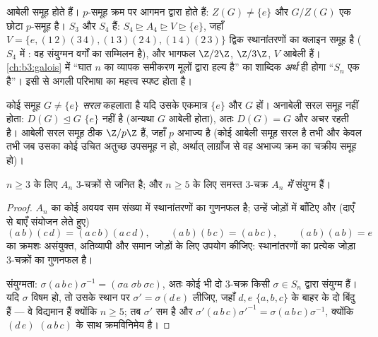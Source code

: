 \begin{example}\label{ex:b3:groups:solvableexamples}
आबेली समूह  होते हैं। $p$-समूह क्रम पर आगमन द्वारा 
होते हैं: $Z(G) \neq \{e\}$ और $G/Z(G)$ एक छोटा $p$-समूह है। $S_3$ और $S_4$
 हैं: $S_4 \trianglerighteq A_4
\trianglerighteq V \trianglerighteq \{e\}$, जहाँ $V = \{e,
(1\,2)(3\,4), (1\,3)(2\,4), (1\,4)(2\,3)\}$ द्विक स्थानांतरणों का क्लाइन समूह
है ($S_4$ में : वह संयुग्मन वर्गों का सम्मिलन है),
और भागफल $\Z/2\Z$, $\Z/3\Z$, $V$ आबेली हैं। \cref{ch:b3:galois} में ``घात $n$
का व्यापक समीकरण मूलों द्वारा हल्य है'' का शाब्दिक \emph{अर्थ}
ही होगा ``$S_n$ एक  है''। इसी से अगली परिभाषा का महत्त्व
स्पष्ट होता है।
\end{example}

\begin{definition}\label{def:b3:groups:simple}
कोई समूह $G \neq \{e\}$ \emph{सरल} कहलाता है यदि उसके
एकमात्र  $\{e\}$ और $G$ हों। अनाबेली सरल समूह
 नहीं होता: $D(G) \trianglelefteq G$ $\{e\}$ नहीं है (अन्यथा $G$ आबेली होता),
अतः $D(G) = G$ और  अचर रहती है। आबेली सरल समूह ठीक
$\Z/p\Z$ हैं, जहाँ $p$ अभाज्य है (कोई आबेली समूह सरल है तभी और
केवल तभी जब उसका कोई उचित अतुच्छ उपसमूह न हो, अर्थात् लाग्राँज से
वह अभाज्य क्रम का चक्रीय समूह हो)।
\end{definition}

\begin{lemma}\label{lem:b3:groups:threecycles}
$n \geq 3$ के लिए $A_n$ $3$-चक्रों से जनित है; और $n \geq 5$ के लिए
समस्त $3$-चक्र \emph{$A_n$ में} संयुग्म हैं।
\end{lemma}

\begin{proof}
$A_n$ का कोई अवयव सम संख्या में स्थानांतरणों का गुणनफल है; उन्हें
जोड़ों में बाँटिए और (दाएँ से बाएँ संयोजन लेते हुए)
\[
(a\,b)(c\,d) = (a\,c\,b)(a\,c\,d), \qquad
(a\,b)(b\,c) = (a\,b\,c), \qquad
(a\,b)(a\,b) = e
\]
का क्रमशः असंयुक्त, अतिव्यापी और समान जोड़ों के लिए उपयोग कीजिए:
स्थानांतरणों का प्रत्येक जोड़ा $3$-चक्रों का गुणनफल है।

संयुग्मता: $\sigma(a\,b\,c)\sigma^{-1} = (\sigma a\; \sigma b\;
\sigma c)$, अतः कोई भी दो $3$-चक्र किसी $\sigma \in
S_n$ द्वारा
संयुग्म हैं। यदि $\sigma$ विषम हो, तो उसके स्थान पर $\sigma' = \sigma (d\,e)$ लीजिए,
जहाँ $d, e$ $\{a, b, c\}$ के बाहर के दो बिंदु हैं --- वे विद्यमान हैं
क्योंकि $n \geq 5$; तब $\sigma'$ सम है और $\sigma'(a\,b\,c)
\sigma'^{-1} = \sigma(a\,b\,c)\sigma^{-1}$, क्योंकि $(d\,e)$ $(a\,b\,c)$ के
साथ क्रमविनिमेय है।
\end{proof}

